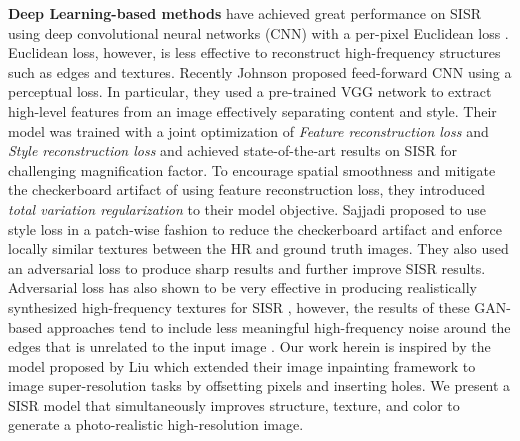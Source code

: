 \documentclass[10pt,twocolumn,letterpaper]{article}
\begin{document}
\textbf{Deep Learning-based methods} have achieved great performance on SISR using deep convolutional neural networks (CNN) with a per-pixel Euclidean loss \cite{shi2016real,dong2014learning,kim2016accurate}. 
Euclidean loss, however, is less effective to reconstruct high-frequency structures such as edges and textures. Recently Johnson \etal \cite{johnson2016perceptual} proposed feed-forward CNN using a perceptual loss. In particular, they used a pre-trained VGG network \cite{simonyan2014very} to extract high-level features from an image effectively separating content and style. Their model was trained with a joint optimization of \textit{Feature reconstruction loss} and \textit{Style reconstruction loss} and achieved state-of-the-art results on SISR for challenging  magnification factor. To encourage spatial smoothness and mitigate the checkerboard artifact \cite{odena2016deconvolution} of using feature reconstruction loss, they introduced \textit{total variation regularization} \cite{rudin1992nonlinear} to their model objective. Sajjadi \etal \cite{sajjadi2017enhancenet} proposed to use style loss in a patch-wise fashion to reduce the checkerboard artifact and enforce locally similar textures between the HR and ground truth images. They also used an adversarial loss to produce sharp results and further improve SISR results. Adversarial loss has also shown to be very effective in producing realistically synthesized high-frequency textures for SISR \cite{ledig2017photo,haris2018deep,park2018srfeat}, however, the results of these GAN-based approaches tend to include less meaningful high-frequency noise around the edges that is unrelated to the input image \cite{park2018srfeat}. Our work herein is inspired by the model proposed by Liu \etal \cite{Liu_2018_ECCV} which extended their image inpainting framework to image super-resolution tasks by offsetting pixels and inserting holes. We present a SISR model that simultaneously improves structure, texture, and color to generate a photo-realistic high-resolution image.
\end{document}
